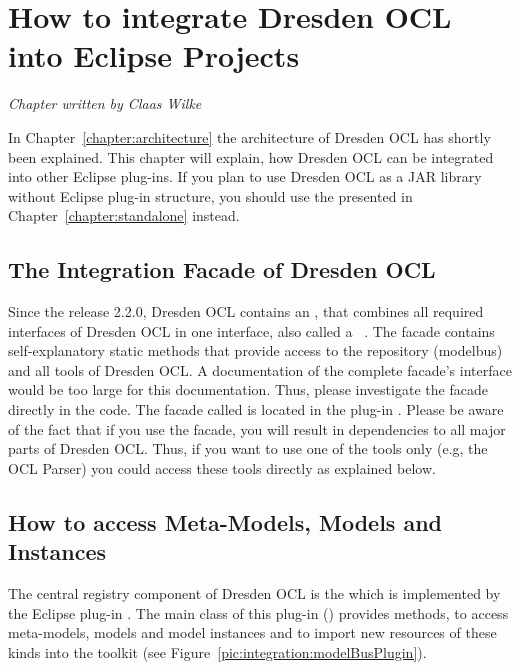 \chapter{How to integrate Dresden OCL into Eclipse Projects}
\label{chapter:integration}

\begin{flushright}
\textit{Chapter written by Claas Wilke}
\end{flushright}

In Chapter~\ref{chapter:architecture} the architecture of Dresden OCL has shortly
been explained. This chapter will explain, how Dresden OCL can be integrated into
other Eclipse plug-ins. If you plan to use Dresden OCL as a \acs{JAR} library
without Eclipse plug-in structure, you should use the  presented in Chapter~\ref{chapter:standalone} instead.



\section{The Integration Facade of Dresden OCL}

Since the release 2.2.0, Dresden OCL contains an ,
that combines all required interfaces of Dresden OCL in one interface, also
called a ~\cite{gamma:dp}. The facade contains self-explanatory 
static methods that provide access to the repository (modelbus) and all tools 
of Dresden OCL. A documentation of the complete facade's interface would be too
large for this documentation. Thus, please investigate the facade directly in
the code. The facade called  is located in the 
plug-in . Please be aware of the fact that 
if you use the facade, you will result in dependencies to all major parts of
Dresden OCL. Thus, if you want to use one of the tools only (e.g, the \acs{OCL}
Parser) you could access these tools directly as explained below.



\section{How to access Meta-Models, Models and Instances}

The central registry component of Dresden OCL is the 
which is implemented by the Eclipse plug-in 
. The main class of this plug-in 
() provides 
methods, to access meta-models, models and model instances and to import new
resources of these kinds into the toolkit (see 
Figure~\ref{pic:integration:modelBusPlugin}).

